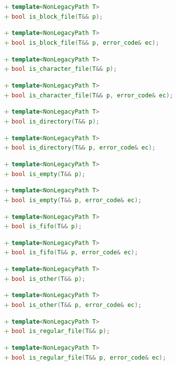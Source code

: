 \documentclass[11pt]{article}
\newcommand{\code}[2][cpp]{\lstinline[language=#1,basicstyle=\small\ttfamily]{#2}}
\newcommand{\tsreplace}[3]{\textcolor{red}{\sout{#1}}#2\textcolor{darkgreen}{#3}}
\begin{document}
\tsreplace{}{}{+ \code{template<NonLegacyPath T>}}\\
\tsreplace{}{}{+ \code{bool is_block_file(T&& p);}}

\tsreplace{}{}{+ \code{template<NonLegacyPath T>}}\\
\tsreplace{}{}{+ \code{bool is_block_file(T&& p, error_code& ec);}}

\tsreplace{}{}{+ \code{template<NonLegacyPath T>}}\\
\tsreplace{}{}{+ \code{bool is_character_file(T&& p);}}

\tsreplace{}{}{+ \code{template<NonLegacyPath T>}}\\
\tsreplace{}{}{+ \code{bool is_character_file(T&& p, error_code& ec);}}

\tsreplace{}{}{+ \code{template<NonLegacyPath T>}}\\
\tsreplace{}{}{+ \code{bool is_directory(T&& p);}}

\tsreplace{}{}{+ \code{template<NonLegacyPath T>}}\\
\tsreplace{}{}{+ \code{bool is_directory(T&& p, error_code& ec);}}

\tsreplace{}{}{+ \code{template<NonLegacyPath T>}}\\
\tsreplace{}{}{+ \code{bool is_empty(T&& p);}}

\tsreplace{}{}{+ \code{template<NonLegacyPath T>}}\\
\tsreplace{}{}{+ \code{bool is_empty(T&& p, error_code& ec);}}

\tsreplace{}{}{+ \code{template<NonLegacyPath T>}}\\
\tsreplace{}{}{+ \code{bool is_fifo(T&& p);}}

\tsreplace{}{}{+ \code{template<NonLegacyPath T>}}\\
\tsreplace{}{}{+ \code{bool is_fifo(T&& p, error_code& ec);}}

\tsreplace{}{}{+ \code{template<NonLegacyPath T>}}\\
\tsreplace{}{}{+ \code{bool is_other(T&& p);}}

\tsreplace{}{}{+ \code{template<NonLegacyPath T>}}\\
\tsreplace{}{}{+ \code{bool is_other(T&& p, error_code& ec);}}

\tsreplace{}{}{+ \code{template<NonLegacyPath T>}}\\
\tsreplace{}{}{+ \code{bool is_regular_file(T&& p);}}

\tsreplace{}{}{+ \code{template<NonLegacyPath T>}}\\
\tsreplace{}{}{+ \code{bool is_regular_file(T&& p, error_code& ec);}}
\end{document}
